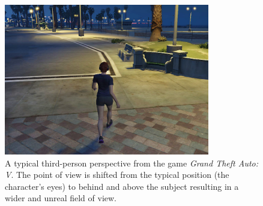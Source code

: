 \documentclass[runningheads,a4paper,oribibl]{llncs}
\begin{document}
\begin{figure}
   \centering
   \includegraphics[width=0.8\textwidth]{ExternalMaterial/GTA}
   \caption{A typical third-person perspective from the game \emph{Grand Theft Auto: V}. The point of view is shifted from the typical position (the character's eyes) to behind and above the subject resulting in a wider and unreal field of view. \label{fig:GTAIV}}
\end{figure}
\end{document}
